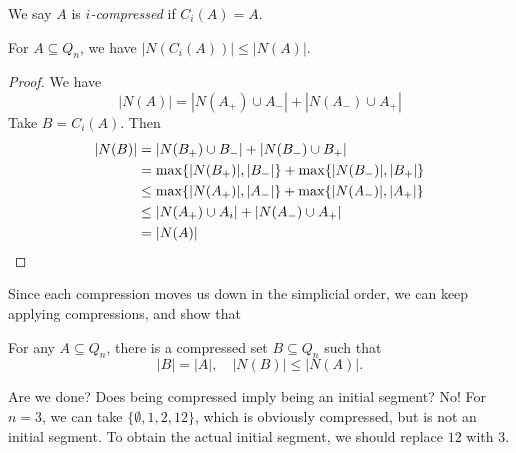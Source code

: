 \documentclass[a4paper]{article}
\begin{document}
We say $A$ is \emph{$i$-compressed} if $C_i(A) = A$.

\begin{lemma}
  For $A \subseteq Q_n$, we have $|N(C_i(A))| \leq |N(A)|$.
\end{lemma}

\begin{proof}
  We have
  \[
    |N(A)| = |N(A_+) \cup A_-| + |N(A_-) \cup A_+|
  \]
  Take $B = C_i(A)$. Then
  \begin{align*}
    |N(B)| &= |N(B_+) \cup B_-| + |N(B_-) \cup B_+|\\
    &= \max \{|N(B_+)|, |B_-|\} + \max \{|N(B_-)|, |B_+|\}\\
    &\leq \max \{|N(A_+)|, |A_-|\} + \max \{|N(A_-)|, |A_+|\}\\
    &\leq |N(A_+) \cup A_i| + |N(A_-) \cup A_+|\\
    &= |N(A)|\qedhere
  \end{align*}
\end{proof}

Since each compression moves us down in the simplicial order, we can keep applying compressions, and show that
\begin{lemma}
  For any $A \subseteq Q_n$, there is a compressed set $B \subseteq Q_n$ such that
  \[
    |B| = |A|,\quad |N(B)| \leq |N(A)|.
  \]
\end{lemma}

Are we done? Does being compressed imply being an initial segment? No! For $n = 3$, we can take $\{\emptyset, 1, 2, 12\}$, which is obviously compressed, but is not an initial segment. To obtain the actual initial segment, we should replace $12$ with $3$.
\begin{center}
\end{center}
\end{document}
